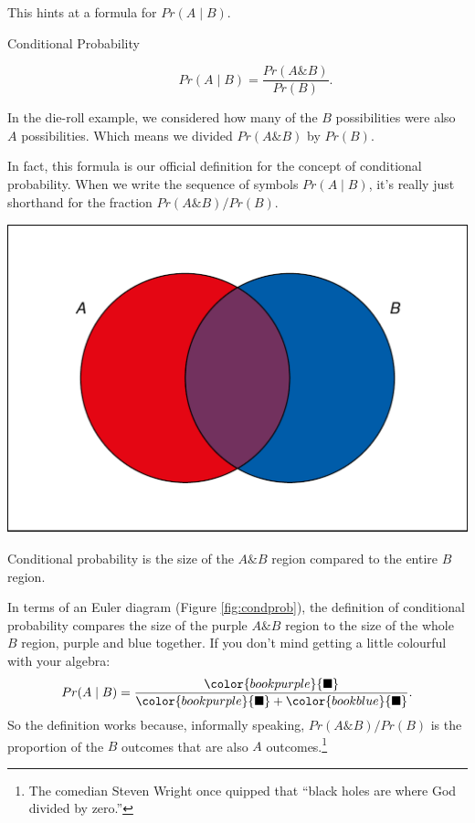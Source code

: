 \documentclass[justified]{tufte-book}
\newcommand{\given}{\mid}
\renewcommand{\wedge}{\mathbin{\&}}
\newcommand{\p}{Pr}
\theoremstyle{definition}
\theoremstyle{definition}
\theoremstyle{definition}
\theoremstyle{remark}
\begin{document}
This hints at a formula for \(\p(A \given B)\).

\begin{description}
\item[Conditional Probability]
\[ \p(A \given B) = \frac{\p(A \wedge B)}{\p(B)}. \]
\end{description}

In the die-roll example, we considered how many of the \(B\)
possibilities were also \(A\) possibilities. Which means we divided
\(\p(A \wedge B)\) by \(\p(B)\).

In fact, this formula is our official definition for the concept of
conditional probability. When we write the sequence of symbols
\(\p(A \given B)\), it's really just shorthand for the fraction
\(\p(A \wedge B) / \p(B)\).

\begin{marginfigure}
\includegraphics{_main_files/figure-latex/condprob-1} \caption[Conditional probability is the size of the $A \wedge B$ region compared to the entire $B$ region]{Conditional probability is the size of the $A \wedge B$ region compared to the entire $B$ region.}\label{fig:condprob}
\end{marginfigure}

In terms of an Euler diagram (Figure \ref{fig:condprob}), the definition
of conditional probability compares the size of the purple
\(A \wedge B\) region to the size of the whole \(B\) region, purple and
blue together. If you don't mind getting a little colourful with your
algebra: \[
  \p(A \given B) = \frac{\color{bookpurple}{\blacksquare}}{\color{bookpurple}{\blacksquare} + \color{bookblue}{\blacksquare}}.
\] So the definition works because, informally speaking,
\(\p(A \wedge B)/\p(B)\) is the proportion of the \(B\) outcomes that
are also \(A\) outcomes.\footnote{The comedian Steven Wright once
  quipped that ``black holes are where God divided by zero.''}
\end{document}
